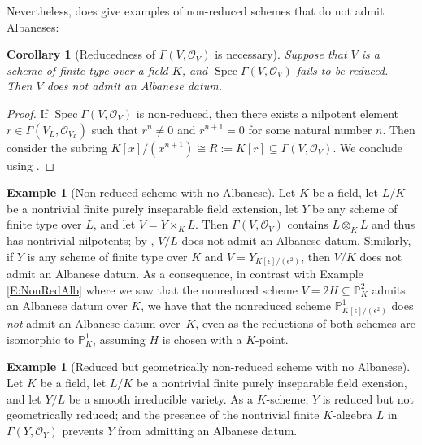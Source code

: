 \documentclass[11pt, reqno]{amsart}
\numberwithin{equation}{section}
\newtheorem{cor}[teo]{Corollary}
\theoremstyle{definition}
\newtheorem{exa}[teo]{Example}
\theoremstyle{remark}
\begin{document}
 Nevertheless,  does give examples of non-reduced schemes that do not admit Albaneses:


\begin{cor}[Reducedness of $\Gamma(V,\mathcal O_V)$ is necessary] \label{C:RX}
Suppose that $V$ is a scheme of finite type over a field $K$, and $\operatorname{Spec}\Gamma(V,\mathcal O_V)$ fails to be reduced. Then $V$ does not admit an Albanese datum.
\end{cor}

\begin{proof} If  $\operatorname{Spec}\Gamma(V,\mathcal O_V)$ is non-reduced, then there exists a nilpotent element  $r\in \Gamma(V_L,\mathcal O_{V_L})$ 
such that $r^n\ne 0$ and $r^{n+1}=0$ for some natural number $n$.
  Then consider the subring $K[x]/(x^{n+1})\cong R:= K[r]\subseteq \Gamma(V,\mathcal O_{V})$.  
   We conclude using .
\end{proof}


\begin{exa}[Non-reduced scheme with no Albanese]\label{E:NonRedAlbX}
Let  $K$ be a field, let $L/K$ be a nontrivial finite purely inseparable
field extension,  
 let $Y$ be any scheme of finite type over $L$, and let $V=Y\times_KL$.  Then $\Gamma(V, \mathcal O_V)$ contains $L\otimes_KL$ and thus has nontrivial nilpotents; by  , $V/L$ does not admit an Albanese datum.  
Similarly, if $Y$ is any scheme of finite type over $K$ and $V=Y_{ K[\epsilon]/(\epsilon^2)}$, then $V/K$ does not admit an Albanese datum. 
As a consequence, in contrast with Example \ref{E:NonRedAlb} where we saw that the nonreduced scheme $V=2H\subseteq \mathbb P^2_K$ admits an Albanese datum over $K$,  we have that the nonreduced scheme $\mathbb P^1_{K[\epsilon]/(\epsilon^2)}$ does \emph{not} admit an Albanese datum over~$K$, even as the reductions of both schemes are isomorphic to $\mathbb P^1_K$, assuming $H$ is chosen with a $K$-point. 
 \end{exa}

  
\begin{exa}[Reduced but geometrically non-reduced scheme with no
  Albanese]\label{E:NonGeomRedAlbX}
Let $K$ be a field, let $L/K$ be a nontrivial finite purely
inseparable field exension, and let $Y/L$ be a smooth irreducible
variety.  As a $K$-scheme, $Y$ is reduced but not geometrically
reduced; and the presence of the nontrivial finite $K$-algebra $L$
 in
$\Gamma(Y, \mathcal O_Y)$ prevents $Y$ from admitting an Albanese
datum.
\end{exa}
\end{document}
